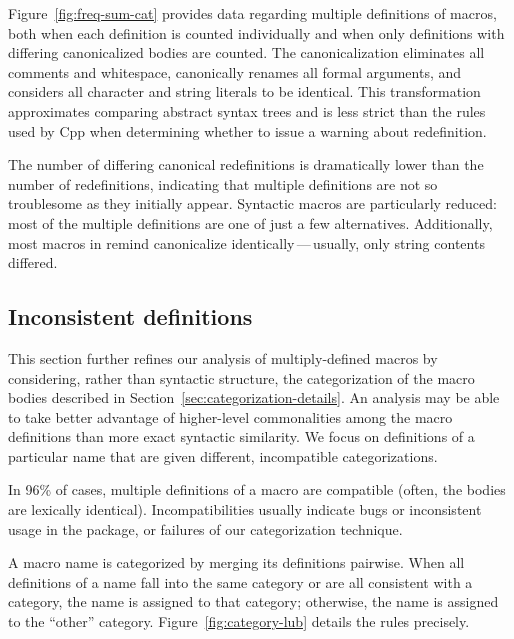 \documentclass[10pt]{article}
\newcommand{\pkg}[1]{\textsf{#1}}
\begin{document}

Figure~\ref{fig:freq-sum-cat} provides data regarding multiple definitions
of macros, both when each definition is counted individually and when only
definitions with differing canonicalized bodies are counted.  The
canonicalization eliminates all comments and whitespace, canonically
renames all formal arguments, and considers all character and string
literals to be identical.  This transformation approximates comparing
abstract syntax trees and is less strict than the rules used by Cpp when
determining whether to issue a warning about redefinition.

The number of differing canonical redefinitions is dramatically lower than
the number of redefinitions, indicating that multiple definitions are not
so troublesome as they initially appear.  Syntactic macros are particularly
reduced: most of the multiple definitions are one of just a few
alternatives.  Additionally, most macros in \pkg{remind} canonicalize
identically\,---\,usually, only string contents differed.


\subsection{Inconsistent definitions}
\label{sec:inconsistent}

This section further refines our analysis of multiply-defined macros by
considering, rather than syntactic structure, the categorization of the
macro bodies described in Section~\ref{sec:categorization-details}.  An
analysis may be able to take better advantage of higher-level commonalities
among the macro definitions than more exact syntactic similarity.  We focus
on definitions of a particular name that are given different, incompatible
categorizations.



In 96\% of cases, multiple definitions of a macro are compatible (often,
the bodies are lexically identical).  Incompatibilities usually indicate
bugs or inconsistent usage in the package, or failures of our
categorization technique.

A macro name is categorized by merging its definitions pairwise.  When all
definitions of a name fall into the same category or are all consistent
with a category, the name is assigned to that category; otherwise, the name
is assigned to the ``other'' category.  Figure~\ref{fig:category-lub}
details the rules precisely.
\end{document}
